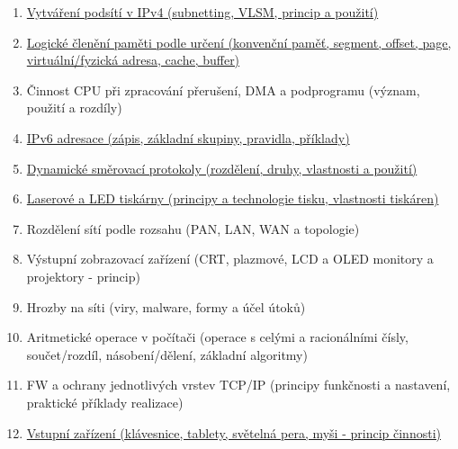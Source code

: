 \documentclass[a4paper,11pt]{article}
\begin{document}
\begin{enumerate}
  \item \hyperref[sec:podsite-ipv4]{Vytváření podsítí v IPv4 (subnetting, VLSM, princip a použití)}
  \item \hyperref[sec:logicke-cleneni-pameti]{Logické členění paměti podle určení (konvenční paměť, segment, offset, page, virtuální/fyzická adresa, cache, buffer)}
  \item Činnost CPU při zpracování přerušení, DMA a podprogramu (význam, použití a rozdíly)
  \item \hyperref[sec:ipv6-adresace]{IPv6 adresace (zápis, základní skupiny, pravidla, příklady)}
  \item \hyperref[sec:smerovaci-protokoly]{Dynamické směrovací protokoly (rozdělení, druhy, vlastnosti a použití)}
  \item \hyperref[sec:tiskarny]{Laserové a LED tiskárny (principy a technologie tisku, vlastnosti tiskáren)}
  \item Rozdělení sítí podle rozsahu (PAN, LAN, WAN a topologie)
  \item Výstupní zobrazovací zařízení (CRT, plazmové, LCD a OLED monitory a projektory - princip)
  \item Hrozby na síti (viry, malware, formy a účel útoků)
  \item Aritmetické operace v počítači (operace s celými a racionálními čísly, součet/rozdíl, násobení/dělení, základní algoritmy)
  \item FW a ochrany jednotlivých vrstev TCP/IP (principy funkčnosti a nastavení, praktické příklady realizace)
  \item \hyperref[sec:vstupni-zarizeni]{Vstupní zařízení (klávesnice, tablety, světelná pera, myši - princip činnosti)}
\end{enumerate}


























\end{document}
